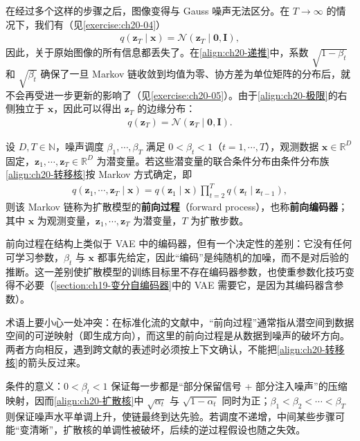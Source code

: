 \documentclass[../../main.tex]{subfiles}
\begin{document}
在经过多个这样的步骤之后，图像变得与 Gauss 噪声无法区分。在 $T\to\infty$ 的情况下，我们有（见\cref{exercise:ch20-04}）
\begin{align}
q(\bm{z}_T\mid\bm{x})=\mathcal{N}(\bm{z}_T\mid\bm{0},\bm{I}),
\label{align:ch20-极限}
\end{align}
因此，关于原始图像的所有信息都丢失了。在\eqref{align:ch20-递推}中，系数 $\sqrt{1-\beta_t}$ 和 $\sqrt{\beta_t}$ 确保了一旦 Markov 链收敛到均值为零、协方差为单位矩阵的分布后，就不会再受进一步更新的影响了（见\cref{exercise:ch20-05}）。由于\eqref{align:ch20-极限}的右侧独立于 $\bm{x}$，因此可以得出 $\bm{z}_T$ 的边缘分布：
\begin{align}
q(\bm{z}_T)=\mathcal{N}(\bm{z}_T\mid\bm{0},\bm{I}).
\label{align:ch20-边缘极限}
\end{align}

\begin{definition}[前向过程]\label{definition:ch20-前向过程}
设 $D,T\in\mathbb{N}$，噪声调度 $\beta_1,\cdots,\beta_T$ 满足 $0<\beta_t<1$（$t=1,\cdots,T$），观测数据 $\bm{x}\in\mathbb{R}^{D}$ 固定，$\bm{z}_1,\cdots,\bm{z}_T\in\mathbb{R}^{D}$ 为潜变量。若这些潜变量的联合条件分布由条件分布族\eqref{align:ch20-转移核}按 Markov 方式确定，即
\begin{align*}
q(\bm{z}_1,\cdots,\bm{z}_T\mid\bm{x})=q(\bm{z}_1\mid\bm{x})\prod_{t=2}^{T}q(\bm{z}_t\mid\bm{z}_{t-1}),
\end{align*}
则该 Markov 链称为扩散模型的\textbf{前向过程}（forward process），也称\textbf{前向编码器}；其中 $\bm{x}$ 为观测变量，$\bm{z}_1,\cdots,\bm{z}_T$ 为潜变量，$T$ 为扩散步数。
\end{definition}

\begin{remark}
前向过程在结构上类似于 VAE 中的编码器，但有一个决定性的差别：它没有任何可学习参数，$\beta_t$ 与 $\bm{x}$ 都事先给定，因此“编码”是纯随机的加噪，而不是对后验的推断。这一差别使扩散模型的训练目标里不存在编码器参数，也使重参数化技巧变得不必要（\cref{section:ch19-变分自编码器}中的 VAE 需要它，是因为其编码器含参数）。\par
术语上要小心一处冲突：在标准化流的文献中，“前向过程”通常指从潜空间到数据空间的可逆映射（即生成方向），而这里的前向过程是从数据到噪声的破坏方向。两者方向相反，遇到跨文献的表述时必须按上下文确认，不能把\eqref{align:ch20-转移核}的箭头反过来。\par
条件的意义：$0<\beta_t<1$ 保证每一步都是“部分保留信号 + 部分注入噪声”的压缩映射，因而\eqref{align:ch20-扩散核}中 $\sqrt{\alpha_t}$ 与 $\sqrt{1-\alpha_t}$ 同时为正；$\beta_1<\beta_2<\cdots<\beta_T$ 则保证噪声水平单调上升，使链最终到达先验。若调度不递增，中间某些步骤可能“变清晰”，扩散核的单调性被破坏，后续的逆过程假设也随之失效。
\end{remark}
\end{document}
